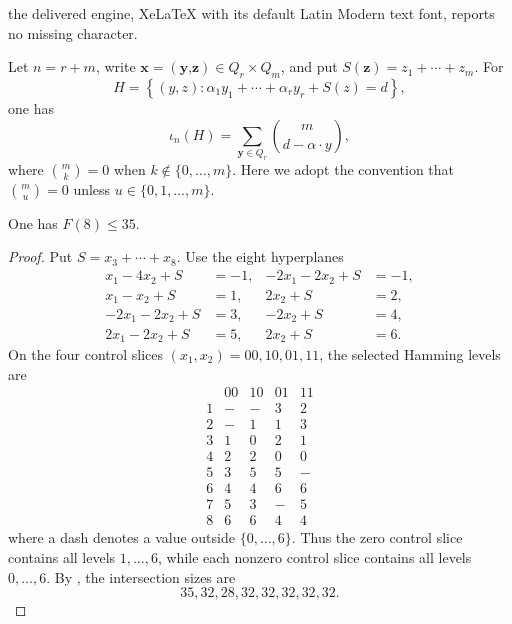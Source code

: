 \documentclass[10pt,a4paper]{amsart}
\newcommand{\Q}{Q}
\newcommand{\isect}{\iota}
\begin{document}
the delivered engine, XeLaTeX with its default Latin Modern text font, reports no missing character.
	\begin{corollary}\label{cor:control-tail}
		Let $n=r+m$, write $\textbf{x}=(\textbf{y,z})\in\Q_r\times\Q_m$, and put $S(\textbf{z})=z_1+\cdots+z_m$. For
		\[
		H=\left\{(y,z):\alpha_1y_1+\cdots+\alpha_ry_r+S(z)=d\right\},
		\]
		one has
		\begin{equation}\label{eq:control-tail-formula}
			\isect_n(H)=\sum_{\textbf{y}\in\Q_r}\binom{m}{d-\alpha\cdot y},
		\end{equation}
		where $\binom{m}{k}=0$ when $k\notin\{0,\dots,m\}$. Here we adopt the convention that
		\(\binom{m}{u}=0\) unless \(u\in\{0,1,\ldots,m\}\).
	\end{corollary}

\begin{proposition}\label{prop:F8}
	One has $F(8)\le35$.
\end{proposition}

\begin{proof}
	Put $S=x_3+\cdots+x_8$. Use the eight hyperplanes
	\begin{align*}
		x_1-4x_2+S&=-1, & -2x_1-2x_2+S&=-1,\\
		x_1-x_2+S&=1, & 2x_2+S&=2,\\
		-2x_1-2x_2+S&=3, & -2x_2+S&=4,\\
		2x_1-2x_2+S&=5, & 2x_2+S&=6.
	\end{align*}
	On the four control slices $(x_1,x_2)=00,10,01,11$, the selected Hamming levels are
	\[
	\begin{array}{c|cccc}
		&00&10&01&11\\\hline
		1&-&-&3&2\\
		2&-&1&1&3\\
		3&1&0&2&1\\
		4&2&2&0&0\\
		5&3&5&5&-\\
		6&4&4&6&6\\
		7&5&3&-&5\\
		8&6&6&4&4
	\end{array}
	\]
	where a dash denotes a value outside $\{0,\dots,6\}$. Thus the zero control slice contains all levels $1,\dots,6$, while each nonzero control slice contains all levels $0,\dots,6$. By , the intersection sizes are
	\[
	35,32,28,32,32,32,32,32.
	\]
\end{proof}
\end{document}

